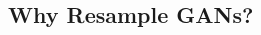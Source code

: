 \documentclass[a0,landscape]{a0poster}
\newcommand{\mysection}[1]{\section*{\fontsize{67.1}{82} \selectfont \color{NavyBlue} #1 \color{Black}}}
\begin{document}

\begin{multicols}{3} %





\Large

\mysection{Why Resample GANs?}


\end{multicols}
\end{document}
